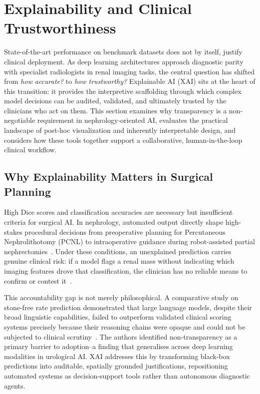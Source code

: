 

\section{Explainability and Clinical Trustworthiness}
\label{sec:xai}

State-of-the-art performance on benchmark datasets does not by itself, justify clinical deployment. As deep learning architectures approach diagnostic parity with specialist radiologists in renal imaging tasks, the central question has shifted from \textit{how accurate?} to \textit{how trustworthy?} Explainable AI (XAI) sits at the heart of this transition: it provides the interpretive scaffolding through which complex model decisions can be audited, validated, and ultimately trusted by the clinicians who act on them. This section examines why transparency is a non-negotiable requirement in nephrology-oriented AI, evaluates the practical landscape of post-hoc visualization and inherently interpretable design, and considers how these tools together support a collaborative, human-in-the-loop clinical workflow.

\subsection{Why Explainability Matters in Surgical Planning}
\label{subsec:why_xai}

High Dice scores and classification accuracies are necessary but insufficient criteria for surgical AI. In nephrology, automated output directly shape high-stakes procedural decisions from preoperative planning for Percutaneous Nephrolithotomy (PCNL) to intraoperative guidance during robot-assisted partial nephrectomies~\cite{li2022automatic}. Under these conditions, an unexplained prediction carries genuine clinical risk: if a model flags a renal mass without indicating which imaging features drove that classification, the clinician has no reliable means to confirm or contest it~\cite{kadhim2024machine}.

This accountability gap is not merely philosophical. A comparative study on stone-free rate prediction demonstrated that large language models, despite their broad linguistic capabilities, failed to outperform validated clinical scoring systems precisely because their reasoning chains were opaque and could not be subjected to clinical scrutiny~\cite{elmaagac2026comparison}. The authors identified non-transparency as a primary barrier to adoption--a finding that generalises across deep learning modalities in urological AI. XAI addresses this by transforming black-box predictions into auditable, spatially grounded justifications, repositioning automated systems as decision-support tools rather than autonomous diagnostic agents.

